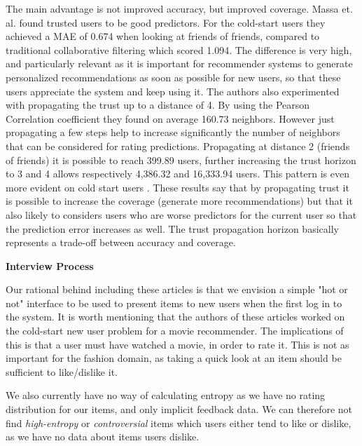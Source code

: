 The main advantage is not improved accuracy, but improved coverage. Massa et. al. \cite{Massa2007} found trusted users to be good predictors. For the cold-start users they achieved a MAE of 0.674 when looking at friends of friends, compared to traditional collaborative filtering which scored 1.094. The difference is very high, and particularly relevant as it is important for recommender systems to generate personalized recommendations as soon as possible for new users, so that these users appreciate the system and keep using it. The authors also experimented with
propagating the trust up to a distance of 4. By using the Pearson Correlation
coefficient they found on average 160.73 neighbors. However just propagating a
few steps help to increase significantly the number of neighbors that can be
considered for rating predictions. Propagating at distance 2 (friends of
friends) it is possible to reach 399.89 users, further increasing the trust
horizon to 3 and 4 allows respectively 4,386.32 and 16,333.94 users. This
pattern is even more evident on cold start users \cite{Massa2004}. These
results say that by propagating trust it is possible to increase the coverage
(generate more recommendations) but that it also likely to considers users who are worse
predictors for the current user so that the prediction error increases as well.
The trust propagation horizon basically represents a trade-off between accuracy
and coverage.

\textbf{Interview Process}

Our rational behind including these articles is that we envision a simple "hot or not" interface to be used to present items to new users when the first log in to the system. It is worth mentioning that the authors of these articles worked on the cold-start new user problem for a movie recommender. The implications of this is that a user must have watched a movie, in order to rate it. This is not as important for the fashion domain, as taking a quick look at an item should be sufficient to like/dislike it. 

We also currently have no way of calculating entropy as we have no rating distribution for our items, and only implicit feedback data. We can therefore not find \emph{high-entropy} or \emph{controversial} items which users either tend to like or dislike, as we have no data about items users dislike. 


